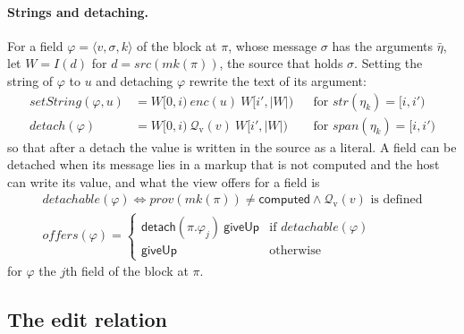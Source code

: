\documentclass[11pt]{article}
\numberwithin{equation}{section}
\newcommand{\kw}[1]{\ensuremath{\mathsf{#1}}}
\begin{document}
\paragraph{Strings and detaching.}
For a field $\varphi = \langle v, \sigma, k \rangle$ of the block at $\pi$,
whose message $\sigma$ has the arguments $\bar\eta$, let $W = I(d)$ for $d
= \mathit{src}(\mathit{mk}(\pi))$, the source that holds $\sigma$.
Setting the string of $\varphi$ to $u$ and detaching $\varphi$ rewrite the
text of its argument:
\begin{equation}\label{eq:edit-string}
\begin{aligned}
\mathit{setString}(\varphi, u) &= W[0, i)\ \mathit{enc}(u)\ W[i', |W|)
  && \text{for } \mathit{str}(\eta_k) = [i, i') \\
\mathit{detach}(\varphi) &= W[0, i)\ \mathcal{Q}_{\mathrm{v}}(v)\
  W[i', |W|)
  && \text{for } \mathit{span}(\eta_k) = [i, i')
\end{aligned}
\end{equation}
so that after a detach the value is written in the source as a literal.  A
field can be detached when its message lies in a markup that is not
computed and the host can write its value, and what the view offers for a
field is
\begin{equation}\label{eq:detachable}
\begin{gathered}
\mathit{detachable}(\varphi) \iff \mathit{prov}(\mathit{mk}(\pi)) \neq
  \kw{computed} \wedge \mathcal{Q}_{\mathrm{v}}(v) \text{ is defined}
\\
\mathit{offers}(\varphi) =
\begin{cases}
\kw{detach}(\pi.\varphi_j)\ \kw{giveUp} & \text{if }
  \mathit{detachable}(\varphi) \\
\kw{giveUp} & \text{otherwise}
\end{cases}
\end{gathered}
\end{equation}
for $\varphi$ the $j$th field of the block at $\pi$.

\subsection{The edit relation}
\label{sec:edit-relation}
\end{document}
